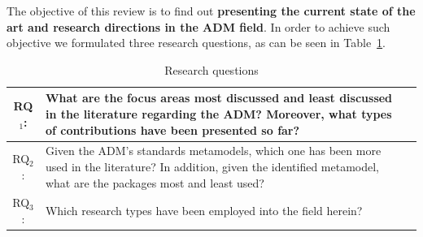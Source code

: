 

The objective of this review is to find out \textbf{presenting the current state of the art and research directions in the ADM field}. In order to achieve such objective we formulated three research questions, as can be seen in Table~\ref{tab:research_questions}.

\begin{table}
\centering
\caption{Research questions\label{tab:research_questions}}
\begin{tabularx}{
1.0\textwidth}{|c|X|X|}
\hline 
RQ$_1$: & What are the focus areas most discussed and least discussed in the
literature regarding the ADM? Moreover, what types of contributions
have been presented so far?\tabularnewline
\hline 
RQ$_2$: & Given the ADM's standards metamodels, which one has been more used
in the literature? In addition, given the identified metamodel, what
are the packages most and least used?\tabularnewline
\hline 
RQ$_3$: & Which research types have been employed into the field herein?\tabularnewline
\hline 
\end{tabularx}
\end{table}





